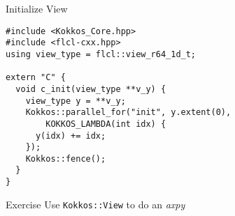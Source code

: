 \begin{frame}[containsverbatim]{Initialize View}
  \begin{verbatim}
#include <Kokkos_Core.hpp>
#include <flcl-cxx.hpp>
using view_type = flcl::view_r64_1d_t;

extern "C" {
  void c_init(view_type **v_y) {
    view_type y = **v_y;
    Kokkos::parallel_for("init", y.extent(0), 
        KOKKOS_LAMBDA(int idx) {
      y(idx) += idx;
    });
    Kokkos::fence();
  }
}
  \end{verbatim}
\end{frame}

\begin{frame}{Exercise}
  Use \texttt{Kokkos::View} to do an \emph{axpy}
\end{frame}


